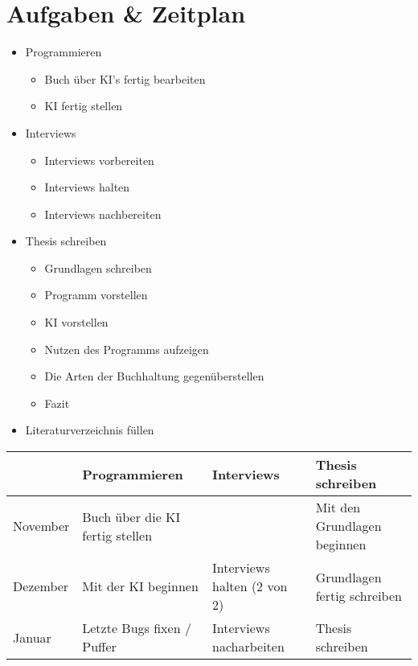 \documentclass[hidelinks,12pt,a4paper]{article}
\begin{document}
\section{Aufgaben \& Zeitplan}
\begin{itemize}
	\item Programmieren
	\begin{itemize}
		\item Buch über KI's fertig bearbeiten 
		\item KI fertig stellen 
	\end{itemize}

	\item Interviews
	\begin{itemize}
		\item Interviews vorbereiten 
		\item Interviews halten 
		\item Interviews nachbereiten 
	\end{itemize}

	\item Thesis schreiben 
	\begin{itemize}
		\item Grundlagen schreiben 
		\item Programm vorstellen 
		\item KI vorstellen 
		\item Nutzen des Programms aufzeigen 
		\item Die Arten der Buchhaltung gegenüberstellen 
		\item Fazit 
	\end{itemize}

	\item Literaturverzeichnis füllen
\end{itemize}


  \begin{tabularx}{\textwidth}{|l*{3}{|>{\raggedright\arraybackslash}X}|}\hline
	& Programmieren & Interviews & Thesis schreiben \\\hline
	November & Buch über die KI fertig stellen & & Mit den Grundlagen beginnen \\\hline
	Dezember & Mit der KI beginnen & Interviews halten (2 von 2) & Grundlagen fertig schreiben \\\hline
	Januar & Letzte Bugs fixen / Puffer & Interviews nacharbeiten & Thesis schreiben  \\\hline
\end{tabularx}
  

%
\end{document}
